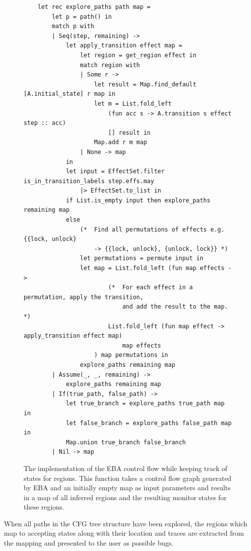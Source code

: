 \begin{figure}[H]
    \centering
    \begin{verbatim}
    let rec explore_paths path map = 
        let p = path() in
        match p with
        | Seq(step, remaining) -> 
            let apply_transition effect map = 
                let region = get_region effect in 
                match region with 
                | Some r -> 
                    let result = Map.find_default [A.initial_state] r map in 
                    let m = List.fold_left 
                        (fun acc s -> A.transition s effect step :: acc)
                        [] result in
                    Map.add r m map
                | None -> map
            in
            let input = EffectSet.filter is_in_transition_labels step.effs.may 
                |> EffectSet.to_list in
            if List.is_empty input then explore_paths remaining map 
            else 
                (*  Find all permutations of effects e.g. {{lock, unlock} 
                    -> {{lock, unlock}, {unlock, lock}} *)
                let permutations = permute input in 
                let map = List.fold_left (fun map effects ->
                        (*  For each effect in a permutation, apply the transition, 
                            and add the result to the map. *)
                        List.fold_left (fun map effect -> apply_transition effect map) 
                            map effects
                    ) map permutations in
                explore_paths remaining map
        | Assume(_, _, remaining) -> 
            explore_paths remaining map
        | If(true_path, false_path) -> 
            let true_branch = explore_paths true_path map in
            let false_branch = explore_paths false_path map in 
            Map.union true_branch false_branch
        | Nil -> map
    \end{verbatim}
    \caption{The implementation of the EBA control flow while keeping track of states for regions. This function takes a control flow graph generated by EBA and an initially empty map as input parameters and results in a map of all inferred regions and the resulting monitor states for these regions.}
    \label{explore_tree-implementation}
\end{figure}

\noindent When all paths in the CFG tree structure have been explored, the regions which map to accepting states along with their location and traces are extracted from the mapping and presented to the user as possible bugs.  

